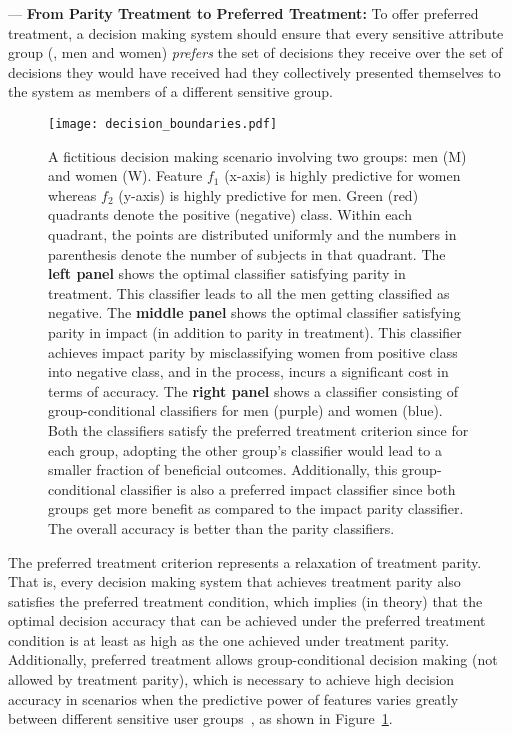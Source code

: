 \documentclass{article}
\begin{document}
\noindent
{\hspace{0.3mm}--- \bf From Parity Treatment to Preferred Treatment:} To offer preferred treatment, a decision making system should ensure that every sensitive attribute group
(\eg, men and women) {\it prefers} the set of decisions they receive over the set of decisions they would have received had they collectively presented themselves
to the system as members of a different sensitive group.





\begin{figure}[t]
    \centering
        \texttt{[image: decision\_boundaries.pdf]}
        \caption{
        \small{
        A fictitious decision making scenario involving two groups: men (M) and women (W). Feature $f_{1}$ (x-axis) is highly predictive for women whereas $f_{2}$ (y-axis) is highly predictive for men. Green (red) quadrants denote the positive (negative) class. Within each quadrant, the points are distributed uniformly and the numbers in parenthesis denote the number of subjects in that quadrant.  The \textbf{left panel} shows the optimal classifier satisfying parity in treatment. This classifier leads to all the men getting classified as negative. The \textbf{middle panel} shows the optimal classifier satisfying parity in impact (in addition to parity in treatment). This classifier achieves impact parity by misclassifying women from positive class into negative class, and in the process, incurs a significant cost in terms of accuracy. The \textbf{right panel} shows a classifier consisting of group-conditional classifiers for men (purple) and women (blue). Both the classifiers satisfy the preferred treatment criterion since for each group, adopting the other group's classifier would lead to a smaller fraction of beneficial outcomes. Additionally, this group-conditional classifier is also a preferred impact classifier since both groups get more benefit as compared to the impact parity classifier. The overall accuracy is better than the parity classifiers.
        }
        }
        \label{fig:example}
\end{figure}

The preferred treatment criterion represents a relaxation of treatment parity. That is, every decision making system that achieves treatment parity also satisfies the preferred treatment
condition, which implies (in theory) that the optimal decision accuracy that can be achieved under the preferred treatment condition is at least as high as the one achieved under treatment parity.
Additionally, preferred treatment allows group-conditional decision making (not allowed by treatment parity), which is necessary to achieve high decision
accuracy in scenarios when the predictive power of features varies greatly between different sensitive user groups~\cite{dwork2017decoupled}, as shown
in Figure~\ref{fig:example}.
\end{document}
